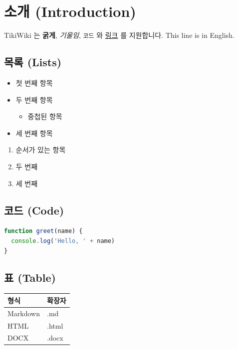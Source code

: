 \documentclass[11pt]{article}
\date{}
\begin{document}
\section*{소개 (Introduction)}\label{소개-introduction}

TikiWiki 는 \textbf{굵게}, \emph{기울임}, \verb|코드| 와
\href{https://example.com}{링크} 를 지원합니다.
This line is in English.

\subsection*{목록 (Lists)}\label{목록-lists}

\begin{itemize}
\item 첫 번째 항목
\item 두 번째 항목
\begin{itemize}
\item 중첩된 항목
\end{itemize}
\item 세 번째 항목
\end{itemize}

\begin{enumerate}
\item 순서가 있는 항목
\item 두 번째
\item 세 번째
\end{enumerate}

\subsection*{코드 (Code)}\label{코드-code}

\begin{lstlisting}[language=js]
function greet(name) {
  console.log('Hello, ' + name)
}
\end{lstlisting}

\subsection*{표 (Table)}\label{표-table}

\begin{table}[htbp]
\centering
\begin{tabular}{ll}
\toprule
형식 & 확장자 \\
\midrule
Markdown & .md \\
HTML & .html \\
DOCX & .docx \\
\bottomrule
\end{tabular}
\end{table}
\end{document}
